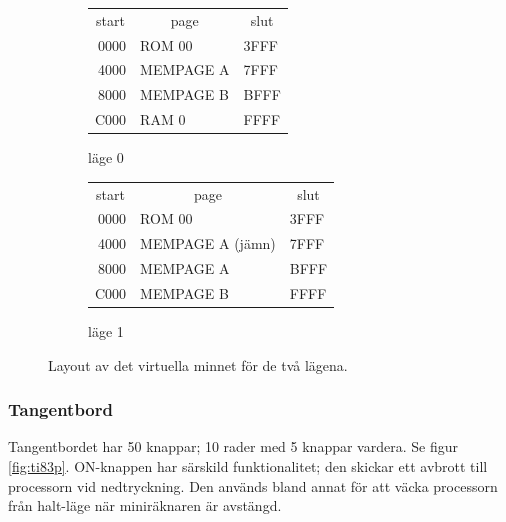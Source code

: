 \documentclass[main.tex]{subfiles}
\begin{document}
\begin{figure}
    \begin{subfigure}{0.5\textwidth}
        \center
        \ttfamily
        \begin{tabular}{r|m{3.5cm}|l}
            \multicolumn{1}{c}{\normalfont start} &
            \multicolumn{1}{c}{\normalfont page} &
            \multicolumn{1}{c}{\normalfont slut} \\ \cline{2-2}
            0000 & ROM 00    & 3FFF \\ \cline{2-2}
            4000 & MEMPAGE A & 7FFF \\ \cline{2-2}
            8000 & MEMPAGE B & BFFF \\ \cline{2-2}
            C000 & RAM 0     & FFFF \\ \cline{2-2}
        \end{tabular}
        \caption{läge 0}
    \end{subfigure}
    \begin{subfigure}{0.5\textwidth}
        \center
        \ttfamily
        \begin{tabular}{r|m{3.5cm}|l}
            \multicolumn{1}{c}{\normalfont start} &
            \multicolumn{1}{c}{\normalfont page} &
            \multicolumn{1}{c}{\normalfont slut} \\ \cline{2-2}
            0000 & ROM 00           & 3FFF \\ \cline{2-2}
            4000 & MEMPAGE A (jämn) & 7FFF \\ \cline{2-2}
            8000 & MEMPAGE A        & BFFF \\ \cline{2-2}
            C000 & MEMPAGE B        & FFFF \\ \cline{2-2}
        \end{tabular}
        \caption{läge 1}
    \end{subfigure}
    \caption{Layout av det virtuella minnet för de två lägena.}
    \label{fig:virtual}
\end{figure}

\subsubsection{Tangentbord}
\label{theory:kbd}
Tangentbordet har 50 knappar; 10 rader med 5 knappar vardera. Se figur
\ref{fig:ti83p}. ON-knappen har särskild funktionalitet; den skickar ett
avbrott till processorn vid nedtryckning. Den används bland annat för att väcka
processorn från halt-läge när miniräknaren är avstängd.
\end{document}
